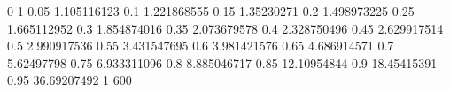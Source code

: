 0    1
0.05 1.105116123
0.1  1.221868555
0.15 1.35230271
0.2  1.498973225
0.25 1.665112952
0.3  1.854874016
0.35 2.073679578
0.4  2.328750496
0.45 2.629917514
0.5  2.990917536
0.55 3.431547695
0.6  3.981421576
0.65 4.686914571
0.7  5.62497798
0.75 6.933311096
0.8  8.885046717
0.85 12.10954844
0.9  18.45415391
0.95 36.69207492
1    600
